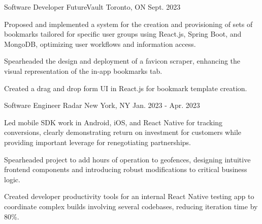 

\begin{cventries}

  \cventry
    {Software Developer} %
    {FutureVault} %
    {Toronto, ON} %
    {Sept. 2023} %
    {
      \begin{cvitems} %
        \item {Proposed and implemented a system for the creation and provisioning of sets of bookmarks tailored for specific user groups using React.js, Spring Boot, and MongoDB, optimizing user workflows and information access.}
        \item {Spearheaded the design and deployment of a favicon scraper, enhancing the visual representation of the in-app bookmarks tab.}
        \item {Created a drag and drop form UI in React.js for bookmark template creation.}
      \end{cvitems}
    }

  \cventry
    {Software Engineer} %
    {Radar} %
    {New York, NY} %
    {Jan. 2023 - Apr. 2023} %
    {
      \begin{cvitems} %
        \item {Led mobile SDK work in Android, iOS, and React Native for tracking conversions, clearly demonstrating return on investment for customers while providing important leverage for renegotiating partnerships.}
        \item {Spearheaded project to add hours of operation to geofences, designing intuitive frontend components and introducing robust modifications to critical business logic.}
        \item {Created developer productivity tools for an internal React Native testing app to coordinate complex builds involving several codebases, reducing iteration time by 80\%.}
      \end{cvitems}
    }


\end{cventries}
